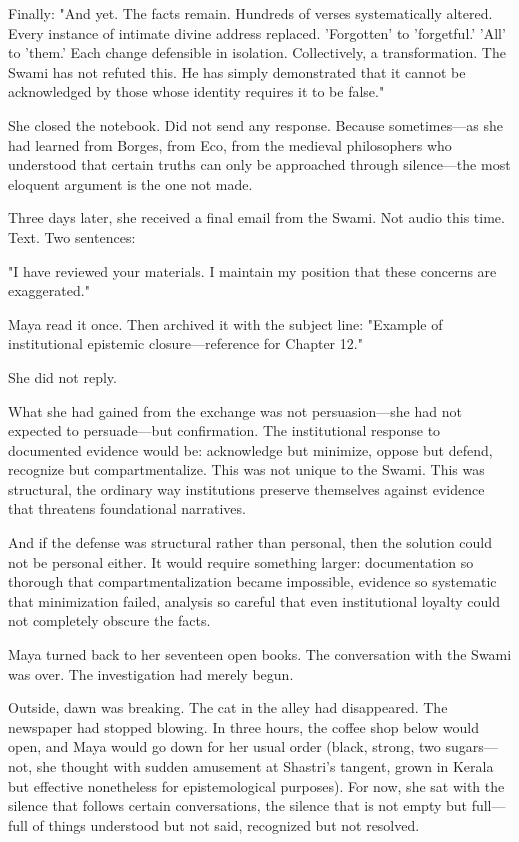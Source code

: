 \documentclass[12pt,twoside]{book}
\begin{document}
Finally: "And yet. The facts remain. Hundreds of verses systematically altered. Every instance of intimate divine address replaced. 'Forgotten' to 'forgetful.' 'All' to 'them.' Each change defensible in isolation. Collectively, a transformation. The Swami has not refuted this. He has simply demonstrated that it cannot be acknowledged by those whose identity requires it to be false."

She closed the notebook. Did not send any response. Because sometimes—as she had learned from Borges, from Eco, from the medieval philosophers who understood that certain truths can only be approached through silence—the most eloquent argument is the one not made.

Three days later, she received a final email from the Swami. Not audio this time. Text. Two sentences:

"I have reviewed your materials. I maintain my position that these concerns are exaggerated."

Maya read it once. Then archived it with the subject line: "Example of institutional epistemic closure—reference for Chapter 12."

She did not reply.

What she had gained from the exchange was not persuasion—she had not expected to persuade—but confirmation. The institutional response to documented evidence would be: acknowledge but minimize, oppose but defend, recognize but compartmentalize. This was not unique to the Swami. This was structural, the ordinary way institutions preserve themselves against evidence that threatens foundational narratives.

And if the defense was structural rather than personal, then the solution could not be personal either. It would require something larger: documentation so thorough that compartmentalization became impossible, evidence so systematic that minimization failed, analysis so careful that even institutional loyalty could not completely obscure the facts.

Maya turned back to her seventeen open books. The conversation with the Swami was over. The investigation had merely begun.

Outside, dawn was breaking. The cat in the alley had disappeared. The newspaper had stopped blowing. In three hours, the coffee shop below would open, and Maya would go down for her usual order (black, strong, two sugars—not, she thought with sudden amusement at Shastri's tangent, grown in Kerala but effective nonetheless for epistemological purposes). For now, she sat with the silence that follows certain conversations, the silence that is not empty but full—full of things understood but not said, recognized but not resolved.
\end{document}

